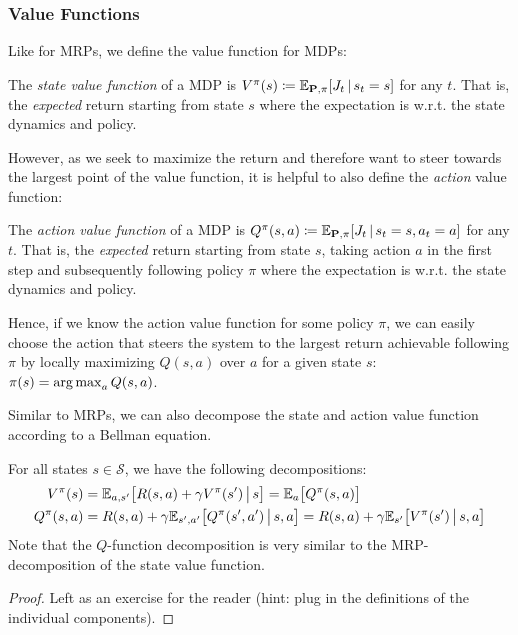 			\subsubsection{Value Functions}
				Like for \acp{MRP}, we define the value function for \acp{MDP}:
				\begin{definition}
					The \emph{state value function} of a \ac{MDP} is \( V^\pi(s) \coloneqq \mathbb{E}_{\bm{\mathrm{P}}, \pi}[J_t \,\vert\, s_t = s] \) for any \(t\). That is, the \emph{expected} return starting from state \(s\) where the expectation is w.r.t. the state dynamics and policy.
				\end{definition}
				However, as we seek to maximize the return and therefore want to steer towards the largest point of the value function, it is helpful to also define the \emph{action} value function:
				\begin{definition}
					The \emph{action value function} of a \ac{MDP} is \( Q^\pi(s, a) \coloneqq \mathbb{E}_{\bm{\mathrm{P}}, \pi}[J_t \,\vert\, s_t = s, a_t = a] \) for any \(t\). That is, the \emph{expected} return starting from state \(s\), taking action \(a\) in the first step and subsequently following policy \(\pi\) where the expectation is w.r.t. the state dynamics and policy.
				\end{definition}
				Hence, if we know the action value function for some policy \(\pi\), we can easily choose the action that steers the system to the largest return achievable following \(\pi\) by locally maximizing \(Q(s, a)\) over \(a\) for a given state \(s\): \( \pi(s) = \operatorname*{arg\,max}_a Q(s, a) \).

				Similar to \acp{MRP}, we can also decompose the state and action value function according to a Bellman equation.

				\begin{theorem}
					For all states \(s \in \mathcal{S}\), we have the following decompositions:
					\begin{align}
						V^\pi(s)    & = \mathbb{E}_{a, s'}\bigl[ R(s, a) + \gamma V^\pi(s') \,\big\vert\, s \bigr] = \mathbb{E}_{a}\bigl[ Q^\pi(s, a) \bigr]                                                                   \\
						Q^\pi(s, a) & = R(s, a) + \gamma \mathbb{E}_{s', a'} \bigl[ Q^\pi(s', a') \,\big\vert\, s, a \bigr] = R(s, a) + \gamma \mathbb{E}_{s'}\bigl[ V^\pi(s') \,\big\vert\, s, a \bigr]  \label{eq:bellmanExpEqQ}
					\end{align}
					Note that the \(Q\)-function decomposition is very similar to the \ac{MRP}-decomposition of the state value function.
				\end{theorem}
				\begin{proof}
					Left as an exercise for the reader (hint: plug in the definitions of the individual components).
				\end{proof}

